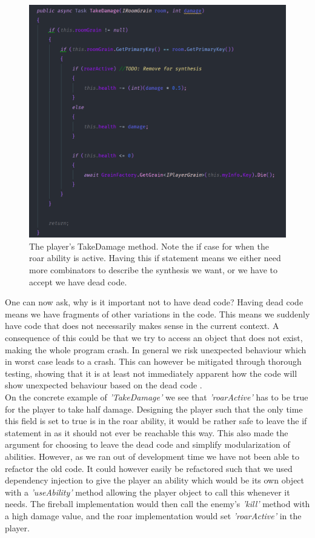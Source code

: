 \begin{figure}[H]
	\centering
	\includegraphics[width=0.8\linewidth]{Materials/Decomposition/TakeDamage}
	\caption{The player's TakeDamage method. Note the if case for when the roar ability is active. Having this if statement means we either need more combinators to describe the synthesis we want, or we have to accept we have dead code. }
	\label{PlayerTakeDamage}
\end{figure}
One can now ask, why is it important not to have dead code? Having dead code means we have fragments of other variations in the code. This means we suddenly have code that does not necessarily makes sense in the current context. A consequence of this could be that we try to access an object that does not exist, making the whole program crash. In general we risk unexpected behaviour which in worst case leads to a crash. This can however be mitigated through thorough testing, showing that it is at least not immediately apparent how the code will show unexpected behaviour based on the dead code .\\
On the concrete example of \textit{'TakeDamage'} we see that \textit{'roarActive'} has to be true for the player to take half damage. Designing the player such that the only time this field is set to true is in the roar ability, it would be rather safe to leave the if statement in as it should not ever be reachable this way. This also made the argument for choosing to leave the dead code and simplify modularization of abilities. However, as we ran out of development time we have not been able to refactor the old code. It could however easily be refactored such that we used dependency injection to give the player an ability which would be its own object with a \textit{'useAbility'} method allowing the player object to call this whenever it needs. The fireball implementation would then call the enemy's \textit{'kill'} method with a high damage value, and the roar implementation would set \textit{'roarActive'} in the player.\\ 
